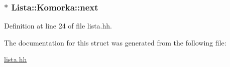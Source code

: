 \hypertarget{struct_lista_1_1_komorka_aa04e9d2ed0260f2adbff6855f7bcd77e}{}
\subsubsection[{next}]{$\ast$ Lista\+::\+Komorka\+::next}\label{struct_lista_1_1_komorka_aa04e9d2ed0260f2adbff6855f7bcd77e}


Definition at line 24 of file lista.\+hh.



The documentation for this struct was generated from the following file\+:\begin{DoxyCompactItemize}
\item 
\hyperlink{lista_8hh}{lista.\+hh}\end{DoxyCompactItemize}
